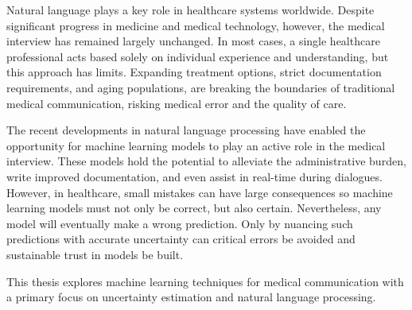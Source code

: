 
Natural language plays a key role in healthcare systems worldwide. 
Despite significant progress in medicine and medical technology, however, the medical interview has remained largely unchanged. 
In most cases, a single healthcare professional acts based solely on individual experience and understanding, but this approach has limits. 
Expanding treatment options, strict documentation requirements, and aging populations, are breaking the boundaries of traditional medical communication, risking medical error and the quality of care. 

The recent developments in natural language processing have enabled the opportunity for machine learning models to play an active role in the medical interview. 
These models hold the potential to alleviate the administrative burden, write improved documentation, and even assist in real-time during dialogues. 
However, in healthcare, small mistakes can have large consequences so machine learning models must not only be correct, but also certain. 
Nevertheless, any model will eventually make a wrong prediction. Only by nuancing such predictions with accurate uncertainty can critical errors be avoided and sustainable trust in models be built.

This thesis explores machine learning techniques for medical communication with a primary focus on uncertainty estimation and natural language processing. 




